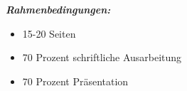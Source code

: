 \documentclass[fontsize=12pt,BCOR=5mm,DIV=12,parskip=half,listof=totoc,
               paper=a4,toc=bibliography,pointlessnumbers]{scrreprt}
\begin{document}
\setTitlepage

%
%
% 

%
%
% 

%
%
%

%
%
\tableofcontents
\cleardoublepage

\emph{\textbf{Rahmenbedingungen:}}
\begin{itemize}
	\item{15-20 Seiten}
	\item{70 Prozent schriftliche Ausarbeitung}
	\item{70 Prozent Präsentation}
\end{itemize}
\cleardoublepage





 
\cleardoublepage

 
\cleardoublepage

%

\initializeText
\onehalfspacing
\end{document}
